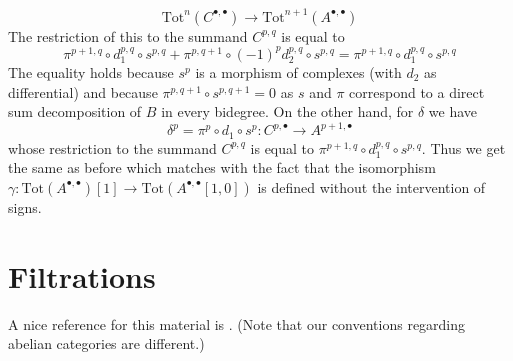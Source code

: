 \begin{remark}
$$\text{Tot}^n(C^{\bullet, \bullet}) \to
\text{Tot}^{n + 1}(A^{\bullet, \bullet})
$$
The restriction of this to the summand $C^{p, q}$ is equal to
$$
\pi^{p + 1, q} \circ
d_1^{p, q} \circ
s^{p, q} +
\pi^{p, q + 1} \circ
(-1)^p d_2^{p, q} \circ
s^{p, q} =
\pi^{p + 1, q} \circ
d_1^{p, q} \circ
s^{p, q}
$$
The equality holds because $s^p$ is a morphism of complexes (with $d_2$
as differential) and because $\pi^{p, q + 1} \circ s^{p, q + 1} = 0$
as $s$ and $\pi$ correspond to a direct sum decomposition of $B$
in every bidegree. On the other hand, for $\delta$ we have
$$
\delta^p =  \pi^p \circ d_1 \circ s^p :
C^{p, \bullet} \to A^{p + 1, \bullet}
$$
whose restriction to the summand $C^{p, q}$ is equal to
$\pi^{p + 1, q} \circ d_1^{p, q} \circ s^{p, q}$.
Thus we get the same as before which matches with the fact that
the isomorphism
$\gamma : \text{Tot}(A^{\bullet, \bullet})[1] \to
\text{Tot}(A^{\bullet, \bullet}[1, 0])$
is defined without the intervention of signs.
\end{remark}







\section{Filtrations}
\label{section-filtrations}

\noindent
A nice reference for this material is \cite[Section 1]{HodgeII}.
(Note that our conventions regarding abelian categories are different.)

